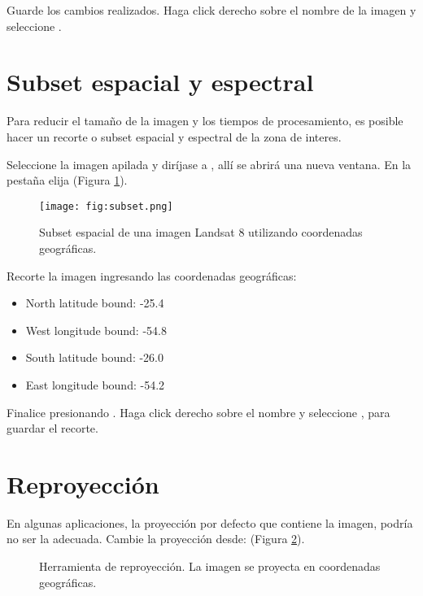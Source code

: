 Guarde los cambios realizados. Haga click derecho sobre el nombre de la imagen y seleccione .

\section{Subset espacial y espectral}
Para reducir el tamaño de la imagen y los tiempos de procesamiento, es posible hacer un recorte o subset espacial y espectral de la zona de interes.

Seleccione la imagen apilada y diríjase a , allí se abrirá una nueva ventana. En la pestaña  elija  (Figura \ref{fig:subset}).

\begin{figure}[h!]
    \centering
    \texttt{[image: fig:subset.png]}
    \caption{Subset espacial de una imagen Landsat 8 utilizando coordenadas geográficas.}
    \label{fig:subset}
\end{figure}

Recorte la imagen ingresando las coordenadas geográficas:

\begin{itemize}
    \item North latitude bound: -25.4
    \item West longitude bound: -54.8
    \item South latitude bound: -26.0
    \item East longitude bound: -54.2
\end{itemize}

Finalice presionando . Haga click derecho sobre el nombre y seleccione  , para guardar el recorte.



\section{Reproyección}
En algunas aplicaciones, la proyección por defecto que contiene la imagen, podría no ser la adecuada. Cambie la proyección desde:  (Figura \ref{fig:repro}).

\begin{figure}[h!]
    \centering
    \hspace{1cm}
    \caption{Herramienta de reproyección. La imagen se proyecta en coordenadas geográficas.}
    \label{fig:repro}
\end{figure}

